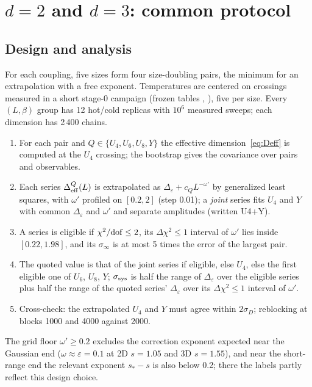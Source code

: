 \documentclass[10pt,a4paper]{article}
\newcommand{\De}{\Delta_\varepsilon}
\newcommand{\Deff}{\Delta_{\rm eff}}
\newcommand{\ssys}{\sigma_{\rm sys}}
\begin{document}
\section{\texorpdfstring{$d=2$ and $d=3$: common protocol}{d=2 and d=3: common protocol}}\label{sec:proto23}
\subsection{Design and analysis}
For each coupling, five sizes form four size-doubling pairs, the minimum for an extrapolation with a free exponent. Temperatures are centered
on crossings measured in a short stage-0 campaign (frozen tables ,
), five per size. Every $(L,\beta)$ group has 12 hot/cold replicas with $10^6$ measured sweeps; each
dimension has 2\,400 chains.
\begin{enumerate}[1.]
\item For each pair and $Q\in\{U_4,U_6,U_8,Y\}$ the effective dimension~\eqref{eq:Deff} is computed at the $U_4$ crossing; the bootstrap gives
 the covariance over pairs and observables.
\item Each series $\Deff^Q(L)$ is extrapolated as $\De+c_QL^{-\omega'}$ by generalized least squares, with $\omega'$ profiled on $[0.2,2]$ (step
 0.01); a \emph{joint} series fits $U_4$ and $Y$ with common $\De$ and $\omega'$ and separate amplitudes (written U4+Y).
\item A series is eligible if $\chi^2/{\rm dof}\le2$, its $\Delta\chi^2\le1$ interval of $\omega'$ lies inside $[0.22,1.98]$, and its
 $\sigma_\infty$ is at most 5 times the error of the largest pair.
\item The quoted value is that of the joint series if eligible, else $U_4$, else the first eligible one of $U_6$, $U_8$, $Y$; $\ssys$ is half
 the range of $\De$ over the eligible series plus half the range of the quoted series' $\De$ over its $\Delta\chi^2\le1$ interval of $\omega'$.
\item Cross-check: the extrapolated $U_4$ and $Y$ must agree within $2\sigma_D$; reblocking at blocks 1000 and 4000 against 2000.
\end{enumerate}
The grid floor $\omega'\ge0.2$ excludes the correction exponent expected near the Gaussian end ($\omega\approx\varepsilon=0.1$ at 2D $s=1.05$
and 3D $s=1.55$), and near the short-range end the relevant exponent $s_*-s$ is also below 0.2; there the labels partly reflect this design
choice.
\end{document}
